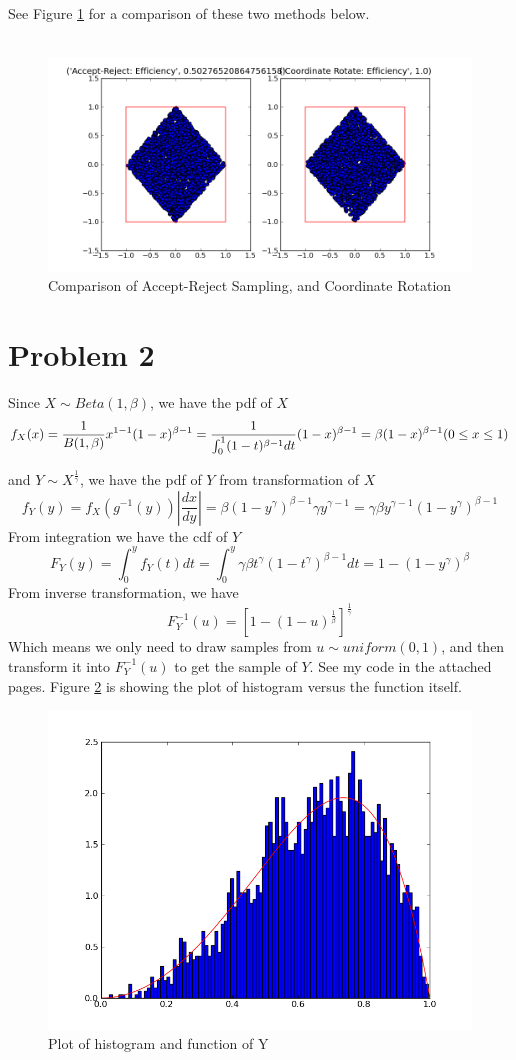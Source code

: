 See Figure \ref{two} for a comparison of these two methods below.  \\\\

\begin{figure}[htb]
\centering
\includegraphics[width=18cm]{p1.png}
\caption{Comparison of Accept-Reject Sampling, and Coordinate Rotation }
\label{two}
\end{figure}




\section*{Problem 2}
Since $X\sim Beta(1,\beta)$, we have the pdf of $X$
\[
f_X(x)=\frac{1}{B(1,\beta)}x^{1-1}(1-x)^{\beta-1}=\frac{1}{\int_0^1 (1-t)^{\beta-1}dt}(1-x)^{\beta-1}=\beta(1-x)^{\beta-1} \\ (0\leq x \leq 1)
\]

and $Y\sim X^{\frac{1}{\gamma}}$, we have the pdf of $Y$ from transformation of $X$
\[
f_Y(y)=f_X(g^{-1}(y))|\frac{dx}{dy}|=\beta(1-y^{\gamma})^{\beta-1}\gamma y^{\gamma-1}=\gamma\beta y^{\gamma-1}(1-y^{\gamma})^{\beta-1}
\]
From integration we have the cdf of $Y$
\[
F_Y(y)
=\int_0^y f_Y(t)dt 
= \int_0^y \gamma\beta t^{\gamma}(1-t^{\gamma})^{\beta-1}dt
=1-(1-y^{\gamma})^{\beta}
\]
From inverse transformation, we have 
\[
F_Y^{-1}(u)=[1-(1-u)^{\frac{1}{\beta}}]^{\frac{1}{\gamma}}
\]
Which means we only need to draw samples from $u\sim uniform(0,1)$, and then transform it into $F_Y^{-1}(u)$ to get the sample of $Y$. See my code in the attached pages. Figure \ref{beta} is showing the plot of histogram versus the function itself. 

\begin{figure}[htb]
\centering
\includegraphics[width=18cm]{p2.png}
\caption{Plot of histogram and function of Y}
\label{beta}
\end{figure}


